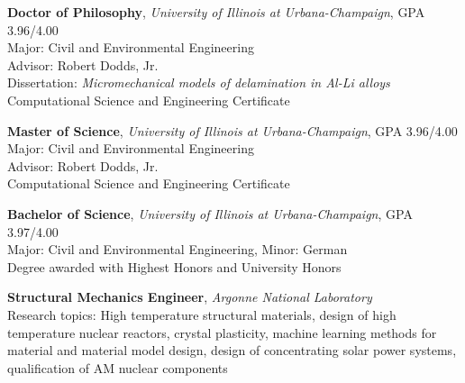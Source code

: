 
\usepackage[sorting=ydnt,style=numeric,defernumbers]{biblatex}










\makecvtitle


\textbf{Doctor of Philosophy}, \emph{University of Illinois at Urbana-Champaign},
GPA 3.96/4.00\\
Major: Civil and Environmental Engineering\\
Advisor: Robert Dodds, Jr. \\
Dissertation: \textit{Micromechanical models of delamination in Al-Li
alloys}\\
Computational Science and Engineering Certificate

\textbf{Master of Science}, \emph{University of Illinois at Urbana-Champaign},
GPA 3.96/4.00 \\
Major: Civil and Environmental Engineering\\
Advisor: Robert Dodds, Jr. \\
Computational Science and Engineering Certificate

\textbf{Bachelor of Science}, \emph{University of Illinois at Urbana-Champaign},
GPA 3.97/4.00 \\
Major: Civil and Environmental Engineering, Minor: German\\
Degree awarded with Highest Honors and University Honors 


\textbf{Structural Mechanics Engineer}, \emph{Argonne National Laboratory}
\\
Research topics: High temperature structural materials, design
of high temperature nuclear reactors, crystal plasticity, machine learning
methods for material and material model design, design of concentrating
solar power systems, qualification of AM nuclear components

